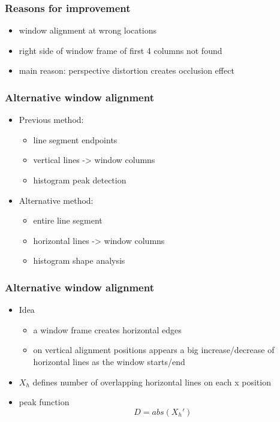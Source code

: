 \documentclass{beamer}
\begin{document}
\frame
{
	\frametitle{Reasons for improvement}
	\begin{itemize}
	\item <+-| alert@+> window alignment at wrong locations
	\item <+-| alert@+> right side of window frame of first 4 columns not found
	\item <+-| alert@+> main reason: perspective distortion creates occlusion effect
	\end{itemize}
}

\frame
{
}

\frame
{
	\frametitle{Alternative window alignment}
	\begin{itemize}
	\item <+-| alert@+> Previous method: 
		\begin{itemize}
		\item <+-| alert@+> line segment endpoints
		\item <+-| alert@+> vertical lines -> window columns
		\item <+-| alert@+> histogram peak detection
		\end{itemize}
	\item <+-| alert@+> Alternative method: 
		\begin{itemize}
		\item <+-| alert@+> entire line segment
		\item <+-| alert@+> horizontal lines -> window columns
		\item <+-| alert@+> histogram shape analysis
		\end{itemize}
	\end{itemize}
}

\frame
{
	\frametitle{Alternative window alignment}
	\begin{itemize}
	\item <+-| alert@+> Idea
		\begin{itemize}
		\item <+-| alert@+> a window frame creates horizontal edges
		\item <+-| alert@+> on vertical alignment positions appears a big increase/decrease
		of horizontal lines as the window starts/end
		\end{itemize}
	\item <+-| alert@+> $X_{h}$ defines number of overlapping horizontal lines on each x position
	\item <+-| alert@+> peak function \[D = abs( X_{h}')\]
	\end{itemize}
}
\end{document}
